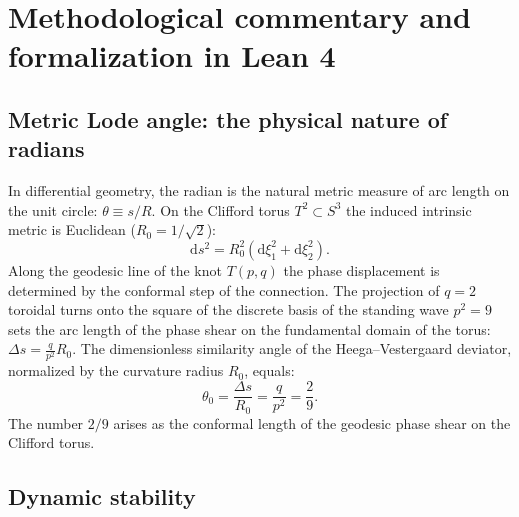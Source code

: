 \documentclass[11pt,a4paper]{article}
\theoremstyle{definition}
\theoremstyle{remark}
\begin{document}
\section{Methodological commentary and formalization in Lean 4}
\subsection{Metric Lode angle: the physical nature of radians}

In differential geometry, the radian is the natural metric measure of arc length on the unit circle: $\theta \equiv s / R$. On the Clifford torus $T^2 \subset S^3$ the induced intrinsic metric is Euclidean ($R_0 = 1/\sqrt{2}$):
\begin{equation}
	\mathrm{d}s^2 = R_0^2 (\mathrm{d}\xi_1^2 + \mathrm{d}\xi_2^2).
\end{equation}
Along the geodesic line of the knot $T(p,q)$ the phase displacement is determined by the conformal step of the connection. The projection of $q=2$ toroidal turns onto the square of the discrete basis of the standing wave $p^2 = 9$ sets the arc length of the phase shear on the fundamental domain of the torus: $\Delta s = \frac{q}{p^2} R_0$. The dimensionless similarity angle of the Heega--Vestergaard deviator, normalized by the curvature radius $R_0$, equals:
\begin{equation}
	\theta_0 = \frac{\Delta s}{R_0} = \frac{q}{p^2} = \frac{2}{9}.
\end{equation}
The number $2/9$ arises as the conformal length of the geodesic phase shear on the Clifford torus.

\subsection{Dynamic stability}
\end{document}
